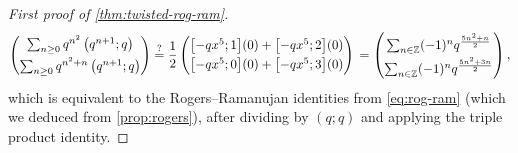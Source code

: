 \documentclass[reqno,11pt]{amsart}
\theoremstyle{definition}
\theoremstyle{remark}
\numberwithin{equation}{section}
\newcommand{\Z}{\mathbb{Z}}
\newcommand{\vect}[2]{\big[{#1};{#2}\big]}
\begin{document}
\begin{proof}[First proof of \cref{thm:twisted-rog-ram}]
\[
    \begin{pmatrix}
    \sum_{n \ge 0} q^{n^2}\left(q^{n+1}; q\right) \vspace{0.1cm} \\ 
    \sum_{n \ge 0} q^{n^2 + n}\left(q^{n+1}; q\right)
    \end{pmatrix}
    \stackrel{?}{=} 
    \frac{1}{2}
    \begin{pmatrix}
    \vect{-qx^5}{1}(0) + \vect{-qx^5}{2}(0)
    \vspace{0.1cm} \\
    \vect{-qx^5}{0}(0) + \vect{-qx^5}{3}(0)
    \end{pmatrix}
    \\
    =
    \begin{pmatrix}
    \sum_{n \in \Z} (-1)^n q^{\frac{5n^2+n}{2}}
    \vspace{0.1cm} \\
    \sum_{n \in \Z} (-1)^n q^{\frac{5n^2+3n}{2}}
    \end{pmatrix},
\]
which is equivalent to the Rogers--Ramanujan identities from \cref{eq:rog-ram} (which we deduced from \cref{prop:rogers}), after dividing by $(q; q)$ and applying the triple product identity.


\end{proof}
\end{document}
